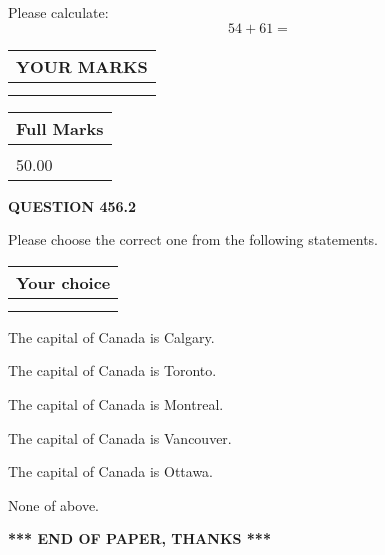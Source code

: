 \documentclass[12pt]{article}
\begin{document}
  
 
Please calculate:
\begin{equation}
54 +  %
61 = \nonumber
\end{equation}
 

 

 
  
\vspace{0.2in}
  
\noindent\begin{tabular}{|l|}
\hline
 YOUR MARKS  \\
\hline
 \\ 
 \\ 
\hline
\end{tabular}
\hspace{0.05in} \begin{tabular}{|l|}
\hline
 Full Marks  \\
\hline
 \\ 
50.00 \\
\hline
\end{tabular}
{\textbf{\Large{QUESTION
456.2 
}}}
  
  
Please choose the correct one from the following statements.
  
  
\noindent\hspace{3.0in} \begin{tabular}{|l|}
\hline
Your choice \\
\hline
 \\ 
 \\ 
\hline
\end{tabular}
  
  
 
 
The capital of Canada is Calgary.
 
 
The capital of Canada is Toronto.
 
 
The capital of Canada is Montreal.
 
 
The capital of Canada is Vancouver.
 
 
The capital of Canada is Ottawa.
 
 
 None of above.
 
 
   
   
 \vspace{0.2in}
 
   
   
   
   
\vspace{1.0in} 
{\textbf{\large{ *** END OF PAPER, THANKS *** }}} 
   
\end{document}
